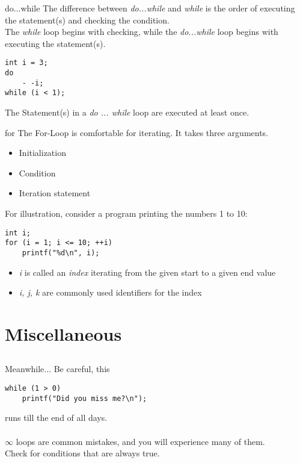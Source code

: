 \begin{frame}[fragile]{do...while}
	The difference between \textit{do...while} and \textit{while} is the order of executing the statement(s) and checking the condition.\\
	\bigskip
	The \textit{while} loop begins with checking, while the \textit{do...while} loop begins with executing the statement(s).
	\begin{lstlisting}[numbers=none]
int i = 3;
do
	- -i;
while (i < 1);
\end{lstlisting}
	\bigskip
	The Statement(s) in a \textit{do ... while} loop are executed at least once.
\end{frame}
\begin{frame}[fragile]{for}
	The For-Loop is comfortable for iterating. It takes three arguments.
	\begin{itemize}
		\item Initialization
		\item Condition
		\item Iteration statement
	\end{itemize}
	\bigskip
	For illustration, consider a program printing the numbers 1 to 10:
	\begin{lstlisting}[numbers=none]
int i;
for (i = 1; i <= 10; ++i)
	printf("%d\n", i);
\end{lstlisting}
	\begin{itemize}
		\item \textit{i} is called an \textit{index} iterating from the given start to a given end value
		\item \textit{i, j, k} are commonly used identifiers for the index
	\end{itemize}
\end{frame}

\section{Miscellaneous}
\subsection{}
\begin{frame}[fragile]{Meanwhile...}
	Be careful, this
	\begin{lstlisting}[numbers=none]
while (1 > 0)
	printf("Did you miss me?\n");
\end{lstlisting}
runs till the end of all days.\\
\ \\$\infty$ loops are common mistakes, and you will experience many of them.\\
Check for conditions that are always true.
\end{frame}

